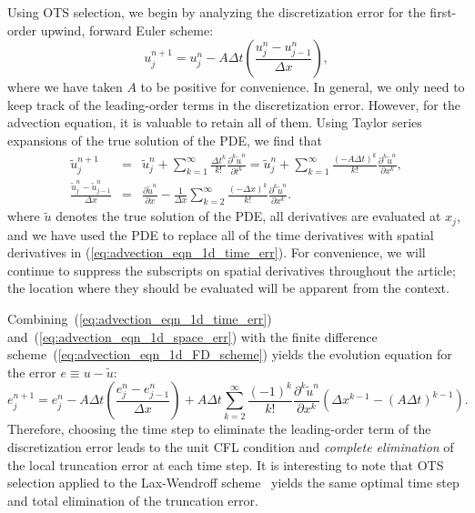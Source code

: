 \documentclass[fleqn,12pt,twoside]{article}
\newcommand{\beq}{\begin{equation}}
\newcommand{\eeq}{\end{equation}}
\newcommand{\bea}{\begin{eqnarray}}
\newcommand{\eea}{\end{eqnarray}}
\def\pt{\partial t}
\def\px{\partial x}
\def\tu{\tilde{u}}
\def\dt{\Delta t}
\def\dx{\Delta x}
\begin{document}
Using OTS selection, we begin by analyzing the discretization error for the 
first-order upwind, forward Euler scheme:
\beq
  u^{n+1}_j = u^{n}_j 
  - A \dt \left( \frac{u^{n}_j - u^{n}_{j-1}}{\dx} \right),
  \label{eq:advection_eqn_1d_FD_scheme}
\eeq
where we have taken $A$ to be positive for convenience.  In general, we only 
need to keep track of the leading-order terms in the discretization error.  
However, for the advection equation, it is valuable to retain all of them.  
Using Taylor series expansions of the true solution of the PDE, we find that 
\bea
  \tu^{n+1}_j &=& \tu^{n}_j 
  + \sum_{k=1}^\infty \frac{\dt^k}{k!} 
       \frac{\partial^k \tu^n}{\pt^k} 
  = \tu^{n}_j + \sum_{k=1}^\infty \frac{\left( -A \dt \right)^k}{k!} 
       \frac{\partial^k \tu^n}{\px^k},
  \label{eq:advection_eqn_1d_time_err} 
  \\
  \frac{\tu^{n}_j - \tu^{n}_{j-1}}{\dx} &=& 
  \frac{\partial \tu^n}{\px} 
  - \frac{1}{\dx} \sum_{k=2}^\infty \frac{\left( -\dx \right)^k}{k!} 
       \frac{\partial^k \tu^n}{\px^k}.
  \label{eq:advection_eqn_1d_space_err}
\eea
where $\tu$ denotes the true solution of the PDE, all derivatives are 
evaluated at $x_j$, and we have used the PDE to replace all of the time 
derivatives with spatial derivatives in (\ref{eq:advection_eqn_1d_time_err}).
For convenience, we will continue to suppress the subscripts on spatial
derivatives throughout the article; the location where they should be 
evaluated will be apparent from the context.

Combining~(\ref{eq:advection_eqn_1d_time_err}) 
and~(\ref{eq:advection_eqn_1d_space_err}) with the finite difference 
scheme~(\ref{eq:advection_eqn_1d_FD_scheme}) yields the evolution
equation for the error $e \equiv u - \tu$:
\beq
  e^{n+1}_j = e^{n}_j 
    - A \dt \left( \frac{e^{n}_j - e^{n}_{j-1}}{\dx} \right) 
    + A \dt \sum_{k=2}^\infty \frac{\left( -1 \right)^k}{k!} 
        \frac{\partial^k \tu^n}{\px^k} 
        \left( \dx^{k-1} - \left( A \dt \right)^{k-1} \right).
  \label{eq:advection_eqn_1d_err_eqn}
\eeq
Therefore, choosing the time step to eliminate the leading-order term 
of the discretization error leads to the unit CFL condition and 
\emph{complete elimination} of the local truncation error at each time step.
It is interesting to note that OTS selection applied to the Lax-Wendroff 
scheme~\cite{leveque_book_2002,leveque_book_1992} yields the same optimal 
time step and total elimination of the truncation error.
\end{document}
